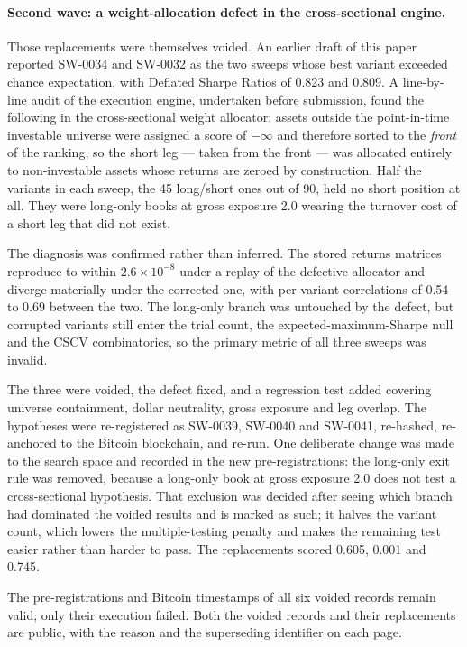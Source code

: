\documentclass[11pt,a4paper]{article}
\begin{document}
\paragraph{Second wave: a weight-allocation defect in the cross-sectional
engine.} Those replacements were themselves voided. An earlier draft of this
paper reported SW-0034 and SW-0032 as the two sweeps whose best variant
exceeded chance expectation, with Deflated Sharpe Ratios of 0.823 and 0.809.
A line-by-line audit of the execution engine, undertaken before submission,
found the following in the cross-sectional weight allocator: assets outside
the point-in-time investable universe were assigned a score of $-\infty$ and
therefore sorted to the \emph{front} of the ranking, so the short leg --- taken
from the front --- was allocated entirely to non-investable assets whose
returns are zeroed by construction. Half the variants in each sweep, the 45
long/short ones out of 90, held no short position at all. They were long-only
books at gross exposure 2.0 wearing the turnover cost of a short leg that did
not exist.

The diagnosis was confirmed rather than inferred. The stored returns matrices
reproduce to within $2.6\times10^{-8}$ under a replay of the defective
allocator and diverge materially under the corrected one, with per-variant
correlations of 0.54 to 0.69 between the two. The long-only branch was
untouched by the defect, but corrupted variants still enter the trial count,
the expected-maximum-Sharpe null and the CSCV combinatorics, so the primary
metric of all three sweeps was invalid.

The three were voided, the defect fixed, and a regression test added covering
universe containment, dollar neutrality, gross exposure and leg overlap. The
hypotheses were re-registered as SW-0039, SW-0040 and SW-0041, re-hashed,
re-anchored to the Bitcoin blockchain, and re-run. One deliberate change was
made to the search space and recorded in the new pre-registrations: the
long-only exit rule was removed, because a long-only book at gross exposure
2.0 does not test a cross-sectional hypothesis. That exclusion was decided
after seeing which branch had dominated the voided results and is marked as
such; it halves the variant count, which lowers the multiple-testing penalty
and makes the remaining test easier rather than harder to pass. The
replacements scored 0.605, 0.001 and 0.745.

The pre-registrations and Bitcoin timestamps of all six voided records remain
valid; only their execution failed. Both the voided records and their
replacements are public, with the reason and the superseding identifier on
each page.
\end{document}
